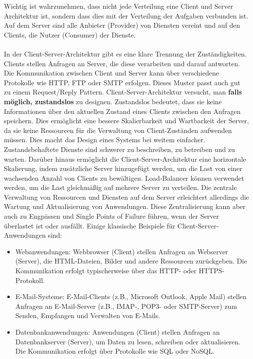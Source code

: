 \documentclass[../vs-script-first-v01.tex]{subfiles}
\begin{document}
Wichtig ist wahrzunehmen, dass nicht jede Verteilung eine Client und Server Architektur ist, sondern dass dies mit der Verteilung der Aufgaben verbunden ist. Auf dem Server sind alle Anbieter (Provider) von Diensten vereint und auf den Clients, die Nutzer (Consumer) der Dienste. 
\\\\
In der Client-Server-Architektur gibt es eine klare Trennung der Zuständigkeiten. Clients stellen Anfragen an Server, die diese verarbeiten und darauf antworten. Die Kommunikation zwischen Client und Server kann über verschiedene Protokolle wie HTTP, FTP oder SMTP erfolgen. Dieses Muster passt auch gut zu einem Request/Reply Pattern. 
Client-Server-Architektur versucht, man \textbf{falls möglich, zustandslos} zu designen. Zustandslos bedeutet, dass sie keine Informationen über den aktuellen Zustand eines Clients zwischen den Anfragen speichern. Dies ermöglicht eine bessere Skalierbarkeit und Wartbarkeit der Server, da sie keine Ressourcen für die Verwaltung von Client-Zuständen aufwenden müssen. Dies macht das Design eines Systems bei weitem einfacher. Zustandsbehaftete Dienste sind schwerer zu beschreiben, zu betreiben und zu warten. 
Darüber hinaus ermöglicht die Client-Server-Architektur eine horizontale Skalierung, indem zusätzliche Server hinzugefügt werden, um die Last von einer wachsenden Anzahl von Clients zu bewältigen. Load-Balancer können verwendet werden, um die Last gleichmäßig auf mehrere Server zu verteilen.
Die zentrale Verwaltung von Ressourcen und Diensten auf dem Server erleichtert allerdings die Wartung und Aktualisierung von Anwendungen. Diese Zentralisierung kann aber auch zu Engpässen und Single Points of Failure führen, wenn der Server überlastet ist oder ausfällt. Einige klassische Beispiele für Client-Server-Anwendungen sind:
\begin{itemize}
\item Webanwendungen: Webbrowser (Client) stellen Anfragen an Webserver (Server), die HTML-Dateien, Bilder und andere Ressourcen zurückgeben. Die Kommunikation erfolgt typischerweise über das HTTP- oder HTTPS-Protokoll.
\item E-Mail-Systeme: E-Mail-Clients (z.B., Microsoft Outlook, Apple Mail) stellen Anfragen an E-Mail-Server (z.B., IMAP-, POP3- oder SMTP-Server) zum Senden, Empfangen und Verwalten von E-Mails.
\item Datenbankanwendungen: Anwendungen (Client) stellen Anfragen an Datenbankserver (Server), um Daten zu lesen, schreiben oder aktualisieren. Die Kommunikation erfolgt über Protokolle wie SQL oder NoSQL.
\end{itemize}
\end{document}
